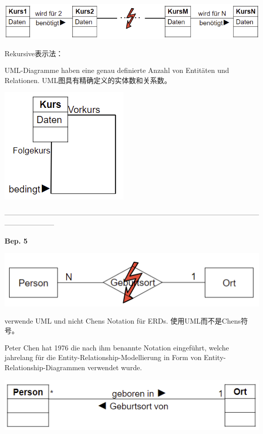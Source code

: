 \documentclass[fleqn]{article}
\begin{document}
\begin{center} 
    \includegraphics[scale=0.5]{14.png}
\end{center}

Rekursive表示法：

UML-Diagramme haben eine genau definierte Anzahl von Entitäten und Relationen. UML图具有精确定义的实体数和关系数。

\begin{center} 
    \includegraphics[scale=0.5]{15.png}
\end{center}

\noindent---------------------------------------------------------------------------------------------------------------------------------

\noindent\textbf{Bep. 5}

\begin{center} 
    \includegraphics[scale=0.5]{16.png}
\end{center}

verwende UML und nicht Chens Notation für ERDs. 使用UML而不是Chens符号。

Peter Chen hat 1976 die nach ihm benannte Notation eingeführt, welche jahrelang für die Entity-Relationship-Modellierung in Form von Entity-Relationship-Diagrammen verwendet wurde.

\begin{center} 
    \includegraphics[scale=0.5]{17.png}
\end{center}
\end{document}
